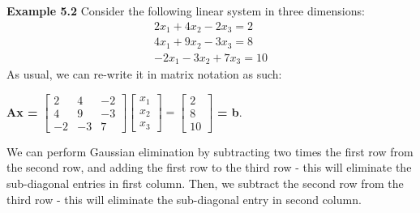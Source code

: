 \documentclass[11pt,a4paper,oneside]{report}
\begin{document}
\begin{framed}
{\bf Example 5.2 } Consider the following linear system in three dimensions:
\begin{eqnarray*}
2x_1 +4x_2 - 2x_3 = 2\\
4x_1 + 9x_2 - 3x_3 = 8\\
-2x_1 - 3x_2 + 7x_3 = 10
\end{eqnarray*}
As usual, we can re-write it in matrix notation as such:
\begin{center}
{\bf Ax = }
$
\begin{bmatrix}
2 & 4 &-2\\
4 & 9 &-3\\
-2 &-3 & 7
\end{bmatrix}
\begin{bmatrix}
x_1 \\
x_2 \\
x_3
\end{bmatrix}
=
\begin{bmatrix}
2\\
8\\
10
\end{bmatrix}
$
{\bf = b}.
\end{center}
We can perform Gaussian elimination by subtracting two times the first row from the second row, and adding the first row to the third row - this will eliminate the sub-diagonal entries in first column. Then, we subtract the second row from the third row  - this will eliminate the sub-diagonal entry in second column.\\


\end{framed}
\end{document}
